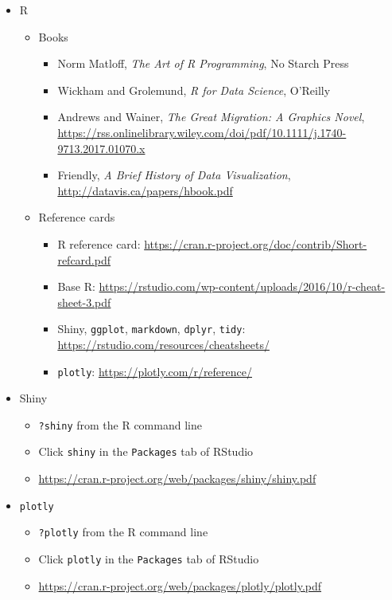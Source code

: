 \documentclass[10pt, letterpaper]{article}
\begin{document}
\begin{spacing}{1.0}
\begin{itemize}
  \item R
    \begin{itemize}   
      \item Books
        \begin{itemize}[noitemsep]
          \item Norm Matloff, \textit{The Art of R Programming}, No Starch Press
          \item Wickham and Grolemund, \textit{R for Data Science}, O'Reilly
          \item Andrews and Wainer, \textit{The Great Migration:  A Graphics Novel}, \url{https://rss.onlinelibrary.wiley.com/doi/pdf/10.1111/j.1740-9713.2017.01070.x}
          \item Friendly, \textit{A Brief History of Data Visualization}, \url{http://datavis.ca/papers/hbook.pdf}
        \end{itemize}
      \item Reference cards
        \begin{itemize}[noitemsep]
          \item R reference card:  \url{https://cran.r-project.org/doc/contrib/Short-refcard.pdf}
          \item Base R:  \url{https://rstudio.com/wp-content/uploads/2016/10/r-cheat-sheet-3.pdf}
          \item Shiny, \texttt{ggplot}, \texttt{markdown}, \texttt{dplyr}, \texttt{tidy}: \url{https://rstudio.com/resources/cheatsheets/}
          \item \texttt{plotly}: \url{https://plotly.com/r/reference/}
        \end{itemize}
    \end{itemize}

  \item Shiny
    \begin{itemize}[noitemsep]
        \item \texttt{?shiny} from the R command line
        \item Click \texttt{shiny} in the \texttt{Packages} tab of RStudio
        \item \url{https://cran.r-project.org/web/packages/shiny/shiny.pdf}
    \end{itemize}

  \item \texttt{plotly}
    \begin{itemize}[noitemsep]
        \item \texttt{?plotly} from the R command line
        \item Click \texttt{plotly} in the \texttt{Packages} tab of RStudio
        \item \url{https://cran.r-project.org/web/packages/plotly/plotly.pdf}
    \end{itemize}


\end{itemize}
\end{spacing}
\end{document}
